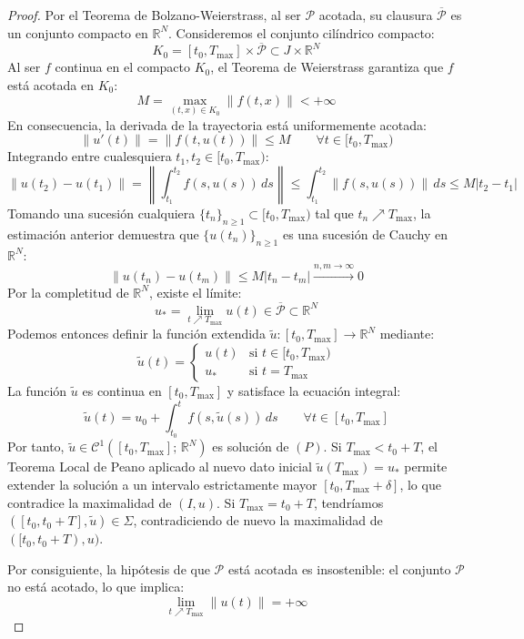 \begin{proof}
    Por el Teorema de Bolzano-Weierstrass, al ser $\mathcal{P}$ acotada, su clausura $\overline{\mathcal{P}}$ es un conjunto compacto en $\mathbb{R}^N$. Consideremos el conjunto cilíndrico compacto:
    \[
        K_0 = [t_0, T_{\max}] \times \overline{\mathcal{P}} \subset J \times \mathbb{R}^N
    \]
    Al ser $f$ continua en el compacto $K_0$, el Teorema de Weierstrass garantiza que $f$ está acotada en $K_0$:
    \[
        M = \max_{(t, x) \in K_0} \|f(t, x)\| < +\infty
    \]
    En consecuencia, la derivada de la trayectoria está uniformemente acotada:
    \[
        \|u'(t)\| = \|f(t, u(t))\| \leq M \qquad \forall t \in [t_0, T_{\max})
    \]
    Integrando entre cualesquiera $t_1, t_2 \in [t_0, T_{\max})$:
    \[
        \|u(t_2) - u(t_1)\| = \left\| \int_{t_1}^{t_2} f(s, u(s)) \, ds \right\| \leq \int_{t_1}^{t_2} \|f(s, u(s))\| \, ds \leq M |t_2 - t_1|
    \]
    Tomando una sucesión cualquiera $\{t_n\}_{n \geq 1} \subset [t_0, T_{\max})$ tal que $t_n \nearrow T_{\max}$, la estimación anterior demuestra que $\{u(t_n)\}_{n \geq 1}$ es una sucesión de Cauchy en $\mathbb{R}^N$:
    \[
        \|u(t_n) - u(t_m)\| \leq M |t_n - t_m| \xrightarrow{n, m \to \infty} 0
    \]
    Por la completitud de $\mathbb{R}^N$, existe el límite:
    \[
        u_* = \lim_{t \nearrow T_{\max}} u(t) \in \overline{\mathcal{P}} \subset \mathbb{R}^N
    \]
    Podemos entonces definir la función extendida $\widetilde{u}: [t_0, T_{\max}] \to \mathbb{R}^N$ mediante:
    \[
        \widetilde{u}(t) = \begin{cases}
            u(t) & \text{si } t \in [t_0, T_{\max}) \\
            u_* & \text{si } t = T_{\max}
        \end{cases}
    \]
    La función $\widetilde{u}$ es continua en $[t_0, T_{\max}]$ y satisface la ecuación integral:
    \[
        \widetilde{u}(t) = u_0 + \int_{t_0}^t f(s, \widetilde{u}(s)) \, ds \qquad \forall t \in [t_0, T_{\max}]
    \]
    Por tanto, $\widetilde{u} \in \mathcal{C}^1([t_0, T_{\max}]; \, \mathbb{R}^N)$ es solución de $(P)$. Si $T_{\max} < t_0 + T$, el Teorema Local de Peano aplicado al nuevo dato inicial $\widetilde{u}(T_{\max}) = u_*$ permite extender la solución a un intervalo estrictamente mayor $[t_0, T_{\max} + \delta]$, lo que contradice la maximalidad de $(I, u)$. Si $T_{\max} = t_0 + T$, tendríamos $([t_0, t_0 + T], \widetilde{u}) \in \Sigma$, contradiciendo de nuevo la maximalidad de $([t_0, t_0 + T), u)$.

    Por consiguiente, la hipótesis de que $\mathcal{P}$ está acotada es insostenible: el conjunto $\mathcal{P}$ no está acotado, lo que implica:
    \[
        \lim_{t \nearrow T_{\max}} \|u(t)\| = +\infty
    \]
\end{proof}

